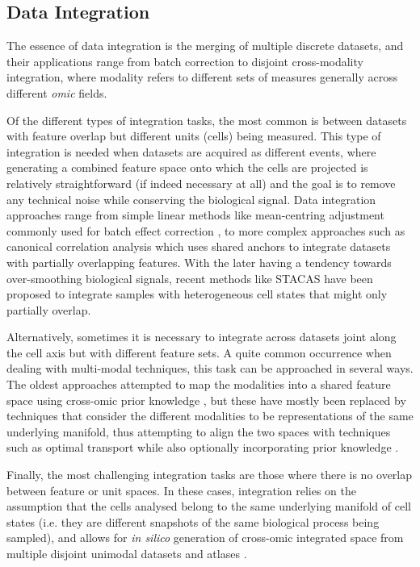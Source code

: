 \subsection{Data Integration}

The essence of data integration is the merging of multiple discrete datasets, and their applications range from batch correction to disjoint cross-modality integration, where modality refers to different sets of measures generally across different \emph{omic} fields.

Of the different types of integration tasks, the most common is between datasets with feature overlap but different units (cells) being measured. This type of integration is needed when datasets are acquired as different events, where generating a combined feature space onto which the cells are projected is relatively straightforward (if indeed necessary at all) and the goal is to remove any technical noise while conserving the biological signal. Data integration approaches range from simple linear methods like mean-centring adjustment commonly used for batch effect correction \cite{hornung_combining_2016}, to more complex approaches such as canonical correlation analysis \cite{butler_integrating_2018} which uses shared anchors to integrate datasets with partially overlapping features. With the later having a tendency towards over-smoothing biological signals, recent methods like STACAS \cite{andreatta_stacas_2021} have been proposed to integrate samples with heterogeneous cell states that might only partially overlap.

Alternatively, sometimes it is necessary to integrate across datasets joint along the cell axis but with different feature sets. A quite common occurrence when dealing with multi-modal techniques, this task can be approached in several ways. The oldest approaches attempted to map the modalities into a shared feature space using cross-omic prior knowledge \cite{chen_assessment_2019}, but these have mostly been replaced by techniques that consider the different modalities to be representations of the same underlying manifold, thus attempting to align the two spaces with techniques such as optimal transport while also optionally incorporating prior knowledge \cite{cao_unsupervised_2020, cao_multi-omics_2022}.

Finally, the most challenging integration tasks are those where there is no overlap between feature or unit spaces. In these cases, integration relies on the assumption that the cells analysed belong to the same underlying manifold of cell states (i.e. they are different snapshots of the same biological process being sampled), and allows for \emph{in silico} generation of cross-omic integrated space from multiple disjoint unimodal datasets and atlases \cite{amodio_magan:_2018,lotfollahi_mapping_2022,cao_multi-omics_2022}.


